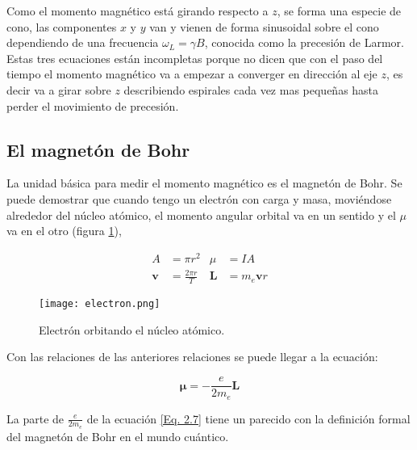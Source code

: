 \documentclass[11pt,fleqn]{book}
\renewcommand{\vec}[1]{\mathbf{#1}}
\begin{document}
\begin{example}
Como el momento magnético está girando respecto a $z$, se forma una especie de cono, las componentes $x$ y $y$ van y vienen de forma sinusoidal sobre el cono dependiendo de una frecuencia $\omega_{L}=\gamma B$, conocida como la precesión de Larmor. Estas tres ecuaciones están incompletas porque no dicen que con el paso del tiempo el momento magnético va a empezar a converger en dirección al eje $z$, es decir va a girar sobre $z$ describiendo espirales cada vez mas pequeñas hasta perder el movimiento de precesión.
\end{example}

\subsection{El magnetón de Bohr}

La unidad básica para medir el momento magnético es el magnetón de Bohr. Se puede demostrar que cuando tengo un electrón con carga y masa, moviéndose alrededor del núcleo atómico, el momento angular orbital va en un sentido y el $\mu$ va en el otro (figura \ref{Fig. 2.5}),

\begin{figure}[H]
    \begin{minipage}[c]{0.4\linewidth}
        \begin{align*}
            A&=\pi r^{2}    &   \mu&=IA \\
            \vec{v}&=\frac{2\pi r}{T}   &   \vec{L}&=m_{e}\vec{v}r 
        \end{align*}
    \end{minipage}\hspace{2mm}
    \begin{minipage}[c]{0.6\linewidth}
        \centering
        \texttt{[image: electron.png]}
        \caption{Electrón orbitando el núcleo atómico.}
        \label{Fig. 2.5}
    \end{minipage}
\end{figure}
\vspace{-4mm}

Con las relaciones de las anteriores relaciones se puede llegar a la ecuación:

\begin{equation}
    \vec{\mu}=-\frac{e}{2m_{e}}\vec{L}
    \label{Eq. 2.7}
\end{equation}

La parte de $\frac{e}{2m_{e}}$ de la ecuación \ref{Eq. 2.7} tiene un parecido con la definición formal del magnetón de Bohr en el mundo cuántico.
\end{document}
